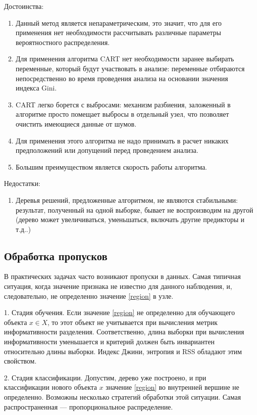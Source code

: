 \documentclass[14pt, a4paper]{article}
\begin{document}
Достоинства:
\begin{enumerate}
\item Данный метод является непараметрическим, это значит, что для его применения нет необходимости рассчитывать различные параметры вероятностного распределения.
\item Для применения алгоритма CART нет необходимости заранее выбирать переменные, который будут участвовать в анализе: переменные отбираются непосредственно во время проведения анализа на основании значения индекса Gini.
\item CART легко борется с выбросами: механизм разбиения, заложенный в алгоритме просто помещает выбросы в отдельный узел, что позволяет очистить имеющиеся данные от шумов.
\item Для применения этого алгоритма не надо принимать в расчет никаких предположений или допущений перед проведением анализа.
\item Большим преимуществом является скорость работы алгоритма.
\end{enumerate}

Недостатки:
\begin{enumerate}
\item Деревья решений, предложенные алгоритмом, не являются стабильными: результат, полученный на одной выборке, бывает не воспроизводим на другой (дерево может увеличиваться, уменьшаться, включать другие предикторы и т.д..)
\end{enumerate}

\subsection{Обработка пропусков}
В практических задачах часто возникают пропуски в данных. Самая типичная ситуация, когда значение признака не известно для данного наблюдения, и, следовательно, не определенно значение \eqref{region} в узле. 

1. Стадия обучения. Если значение \eqref{region} не определенно для обучающего объекта $x \in X$, то этот объект не учитывается при вычисления метрик информативности разделения. Соответственно, длина выборки при вычисления информативности уменьшается и критерий должен быть инвариантен относительно длины выборки. Индекс Джини, энтропия и RSS обладают этим свойством.

2. Стадия классификации. Допустим, дерево уже построено, и при классификации нового объекта $x$ значение \eqref{region} во внутренней вершине не определенно. Возможны несколько стратегий обработки этой ситуации. Самая распространенная --- пропорциональное распределение.
\end{document}
